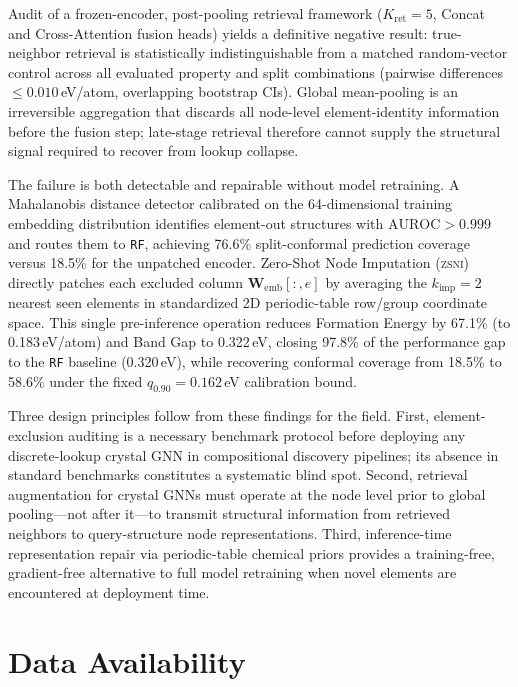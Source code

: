 \documentclass[final,5p,twocolumn,10pt]{elsarticle}
\newcommand{\mae}{\text{MAE}}
\newcommand{\auroc}{\text{AUROC}}
\newcommand{\rf}{\texttt{RF}}
\newcommand{\zsni}{\textsc{zsni}}
\begin{document}
Audit of a frozen-encoder, post-pooling retrieval framework ($K_\text{ret}=5$,
Concat and Cross-Attention fusion heads) yields a definitive negative result:
true-neighbor retrieval is statistically indistinguishable from a matched
random-vector control across all evaluated property and split combinations
(pairwise \mae{} differences $\le 0.010$\,eV/atom, overlapping bootstrap CIs).
Global mean-pooling is an irreversible aggregation that discards all node-level
element-identity information before the fusion step; late-stage retrieval
therefore cannot supply the structural signal required to recover from lookup collapse.

The failure is both detectable and repairable without model retraining.
A Mahalanobis distance detector calibrated on the 64-dimensional training
embedding distribution identifies element-out structures with $\auroc{} > 0.999$
and routes them to \rf{}, achieving 76.6\% split-conformal prediction coverage
versus 18.5\% for the unpatched encoder. Zero-Shot Node Imputation (\zsni{})
directly patches each excluded column $\bm{W}_{\text{emb}}[:,e]$ by averaging
the $k_{\text{imp}}=2$ nearest seen elements in standardized 2D periodic-table
row/group coordinate space. This single pre-inference operation reduces
Formation Energy \mae{} by 67.1\% (to 0.183\,eV/atom) and Band Gap \mae{}
to 0.322\,eV, closing 97.8\% of the performance gap to the \rf{} baseline
(0.320\,eV), while recovering conformal coverage from 18.5\% to 58.6\%
under the fixed $q_{0.90}=0.162$\,eV calibration bound.

Three design principles follow from these findings for the field. First,
element-exclusion auditing is a necessary benchmark protocol before deploying
any discrete-lookup crystal GNN in compositional discovery pipelines;
its absence in standard benchmarks constitutes a systematic blind spot.
Second, retrieval augmentation for crystal GNNs must operate at the node
level prior to global pooling---not after it---to transmit structural information
from retrieved neighbors to query-structure node representations.
Third, inference-time representation repair via periodic-table chemical priors
provides a training-free, gradient-free alternative to full model retraining
when novel elements are encountered at deployment time.

\section*{Data Availability}
\end{document}
